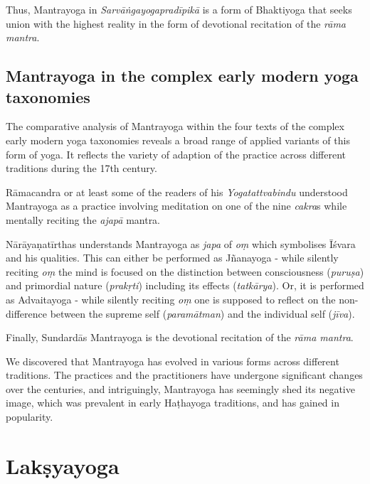 Thus, Mantrayoga in \textit{Sarvāṅgayogapradīpikā} is a form of Bhaktiyoga that seeks union with the highest reality in the form of devotional recitation of the \textit{rāma mantra}. 

\subsection{Mantrayoga in the complex early modern yoga taxonomies}

The comparative analysis of Mantrayoga within the four texts of the complex early modern yoga taxonomies reveals a broad range of applied variants of this form of yoga. It reflects the variety of adaption of the practice across different traditions during the 17th century.

Rāmacandra or at least some of the readers of his \emph{Yogatattvabindu} understood Mantrayoga as a practice involving meditation on one of the nine \textit{cakra}s while mentally reciting the \textit{ajapā} mantra.

Nārāyaṇatīrthas understands Mantrayoga as \textit{japa} of \textit{oṃ} which symbolises Īśvara and his qualities. This can either be performed as Jñanayoga - while silently reciting \textit{oṃ} the mind is focused on the distinction between consciousness (\textit{puruṣa}) and primordial nature (\textit{prakṛti}) including its effects (\textit{tatkārya}). Or, it is performed as Advaitayoga - while silently reciting \textit{oṃ} one is supposed to reflect on the non-difference between the supreme self (\textit{paramātman}) and the individual self (\textit{jīva}).

Finally, Sundardās Mantrayoga is the devotional recitation of the \textit{rāma mantra}.

We discovered that Mantrayoga has evolved in various forms across different traditions. The practices and the practitioners have undergone significant changes over the centuries, and intriguingly, Mantrayoga has seemingly shed its negative image, which was prevalent in early Haṭhayoga traditions, and has gained in popularity. 

\section{Lakṣyayoga}
\label{laksyayogaintro}

